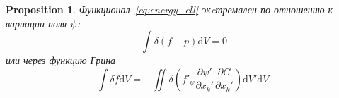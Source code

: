 \documentclass{article}
\theoremstyle{plain}
\newtheorem{proposition}{Proposition}
\newcommand{\dd}{\mathrm{d}}
\newcommand{\pder}[2][]{\frac{\partial#1}{\partial#2}}
\begin{document}
\begin{proposition}
    Функционал~\eqref{eq:energy_ell} экcтремален по отношению к вариации поля \(\psi\):
    \begin{equation}\label{eq:problem2}
        \int \delta(f-p)\dd{V} = 0
    \end{equation}
    или через функцию Грина
    \begin{equation}\label{eq:problem2_Green}
        \int\delta{f}\dd{V} = -\iint \delta\left( f'_\psi\pder[\psi']{x_k'}\pder[G]{x_k'}\right) \dd{V'}\dd{V}.
    \end{equation}
\end{proposition}


\printbibliography
\end{document}
